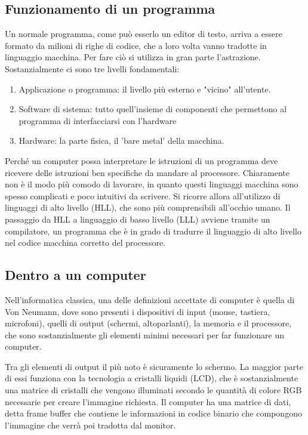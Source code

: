 \documentclass[a4paper,12pt]{article}
\theoremstyle{break}
\numberwithin{equation}{section}
\begin{document}
\subsection{Funzionamento di un programma}
Un normale programma, come può esserlo un editor di testo, arriva a essere formato da milioni di righe di codice, che a loro volta vanno tradotte in linguaggio macchina. Per fare ciò si utilizza in gran parte l'astrazione. Sostanzialmente ci sono tre livelli fondamentali:
\begin{enumerate}
    \item Applicazione o programma: il livello più esterno e "vicino" all'utente.
    \item Software di sistema: tutto quell'insieme di componenti che permettono al programma di interfacciarsi con l'hardware
    \item Hardware: la parte fisica, il 'bare metal' della macchina.
\end{enumerate}
Perché un computer possa interpretare le istruzioni di un programma deve ricevere delle istruzioni ben specifiche da mandare al processore. Chiaramente non è il modo più comodo di lavorare, in quanto questi linguaggi macchina sono spesso complicati e poco intuitivi da scrivere. Si ricorre allora all'utilizzo di linguaggi di alto livello (HLL), che sono più comprensibili all'occhio umano. Il passaggio da HLL a linguaggio di basso livello (LLL) avviene tramite un compilatore, un programma che è in grado di tradurre il linguaggio di alto livello nel codice macchina corretto del processore.
\subsection{Dentro a un computer}
Nell'informatica classica, una delle definizioni accettate di computer è quella di Von Neumann, dove sono presenti i dispositivi di input (mouse, tastiera, microfoni), quelli di output (schermi, altoparlanti), la memoria e il processore, che sono sostanzialmente gli elementi minimi necessari per far funzionare un computer. 


Tra gli elementi di output il più noto è sicuramente lo schermo. La maggior parte di essi funziona con la tecnologia a cristalli liquidi (LCD), che è sostanzialmente una matrice di cristalli che vengono illuminati secondo le quantità di colore RGB necessarie per creare l'immagine richiesta. Il computer ha una matrice di dati, detta frame buffer che contiene le informazioni in codice binario che compongono l'immagine che verrà poi tradotta dal monitor. 
\end{document}
